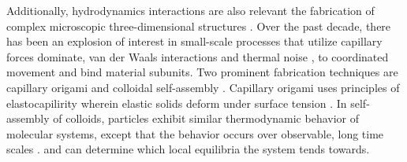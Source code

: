 Additionally, hydrodynamics interactions are also relevant the fabrication of complex microscopic three-dimensional structures \cite{Cho2010}.
Over the past decade, there has been an explosion of interest in small-scale processes that utilize capillary forces dominate,  van der Waals interactions and thermal noise  \cite{Zhang2017}, to coordinated movement and bind  material subunits. Two prominent fabrication techniques are capillary origami 
\cite{Pandey2011,Leong2007,Reynolds2019} and colloidal self-assembly \cite{Dasgupta2017,Siontorou2017}. Capillary origami uses principles of elastocapilirity wherein elastic solids deform under surface tension \cite{Bico2018,VanHonschoten2010}. In self-assembly of colloids, 
particles exhibit similar thermodynamic behavior of molecular systems, except that the behavior occurs over observable, long time scales \cite{Zhang2017}. 
and can determine which local equilibria the system tends towards.


